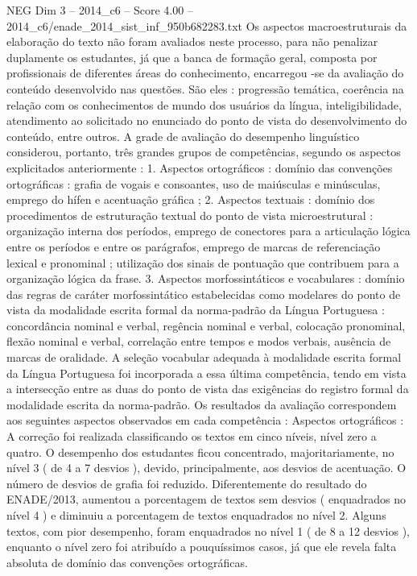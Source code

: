 \begin{textsample}{NEG Dim 3 – 2014\_c6 – Score 4.00 – 2014\_c6/enade\_2014\_sist\_inf\_950b682283.txt}
Os aspectos macroestruturais da elaboração do texto não foram avaliados neste processo, para não penalizar duplamente os estudantes, já que a banca de formação geral, composta por profissionais de diferentes áreas do conhecimento, encarregou -se da avaliação do conteúdo desenvolvido nas questões.
São eles : progressão temática, coerência na relação com os conhecimentos de mundo dos usuários da língua, inteligibilidade, atendimento ao solicitado no enunciado do ponto de vista do desenvolvimento do conteúdo, entre outros.
A grade de avaliação do desempenho linguístico considerou, portanto, três grandes grupos de competências, segundo os aspectos explicitados anteriormente : 1.
Aspectos ortográficos : domínio das convenções ortográficas : grafia de vogais e consoantes, uso de maiúsculas e minúsculas, emprego do hífen e acentuação gráfica ; 2.
Aspectos textuais : domínio dos procedimentos de estruturação textual do ponto de vista microestrutural : organização interna dos períodos, emprego de conectores para a articulação lógica entre os períodos e entre os parágrafos, emprego de marcas de referenciação lexical e pronominal ; utilização dos sinais de pontuação que contribuem para a organização lógica da frase. 3.
Aspectos morfossintáticos e vocabulares : domínio das regras de caráter morfossintático estabelecidas como modelares do ponto de vista da modalidade escrita formal da norma-padrão da Língua Portuguesa : concordância nominal e verbal, regência nominal e verbal, colocação pronominal, flexão nominal e verbal, correlação entre tempos e modos verbais, ausência de marcas de oralidade.
A seleção vocabular adequada à modalidade escrita formal da Língua Portuguesa foi incorporada a essa última competência, tendo em vista a intersecção entre as duas do ponto de vista das exigências do registro formal da modalidade escrita da norma-padrão.
Os resultados da avaliação correspondem aos seguintes aspectos observados em cada competência : Aspectos ortográficos : A correção foi realizada classificando os textos em cinco níveis, nível zero a quatro.
O desempenho dos estudantes ficou concentrado, majoritariamente, no nível 3 ( de 4 a 7 desvios ), devido, principalmente, aos desvios de acentuação.
O número de desvios de grafia foi reduzido.
Diferentemente do resultado do ENADE/2013, aumentou a porcentagem de textos sem desvios ( enquadrados no nível 4 ) e diminuiu a porcentagem de textos enquadrados no nível 2.
Alguns textos, com pior desempenho, foram enquadrados no nível 1 ( de 8 a 12 desvios ), enquanto o nível zero foi atribuído a pouquíssimos casos, já que ele revela falta absoluta de domínio das convenções ortográficas.

\end{textsample}
